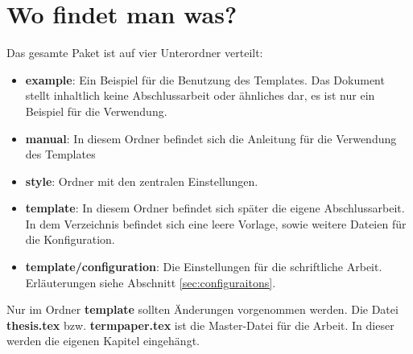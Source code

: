 %
\section{Wo findet man was?}\label{sec:wheretofindwhat}
Das gesamte Paket ist auf vier Unterordner verteilt:
\begin{itemize}
\item \textbf{example}: Ein Beispiel für die Benutzung des Templates. Das Dokument stellt inhaltlich keine Abschlussarbeit oder ähnliches dar, es ist nur ein Beispiel für die Verwendung.
\item \textbf{manual}: In diesem Ordner befindet sich die Anleitung für die Verwendung des Templates
\item \textbf{style}: Ordner mit den zentralen Einstellungen.
\item \textbf{template}: In diesem Ordner befindet sich später die eigene Abschlussarbeit. In dem Verzeichnis befindet sich eine leere Vorlage, sowie weitere Dateien für die Konfiguration.
\item \textbf{template/configuration}: Die Einstellungen für die schriftliche Arbeit. Erläuterungen siehe Abschnitt \ref{sec:configuraitons}.
\end{itemize}

Nur im Ordner \textbf{template} sollten Änderungen vorgenommen werden. Die Datei \textbf{thesis.tex} bzw. \textbf{termpaper.tex} ist die Master-Datei für die Arbeit. In dieser werden die eigenen Kapitel eingehängt.
